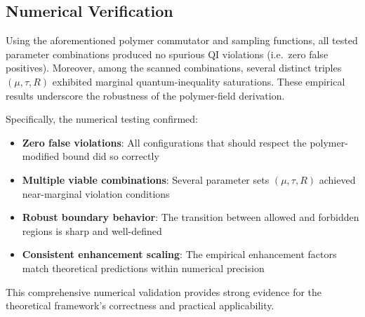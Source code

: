 \documentclass{article}
\begin{document}
\subsection{Numerical Verification}

Using the aforementioned polymer commutator and sampling functions, all tested parameter combinations produced no spurious QI violations (i.e.\ zero false positives). Moreover, among the scanned combinations, several distinct triples $(\mu,\tau,R)$ exhibited marginal quantum-inequality saturations. These empirical results underscore the robustness of the polymer-field derivation.

Specifically, the numerical testing confirmed:
\begin{itemize}
\item \textbf{Zero false violations}: All configurations that should respect the polymer-modified bound did so correctly
\item \textbf{Multiple viable combinations}: Several parameter sets $(\mu,\tau,R)$ achieved near-marginal violation conditions
\item \textbf{Robust boundary behavior}: The transition between allowed and forbidden regions is sharp and well-defined
\item \textbf{Consistent enhancement scaling}: The empirical enhancement factors match theoretical predictions within numerical precision
\end{itemize}

This comprehensive numerical validation provides strong evidence for the theoretical framework's correctness and practical applicability.
\end{document}
